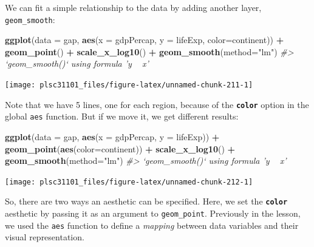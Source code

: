 \documentclass[
]{book}
\newenvironment{Shaded}{\begin{snugshade}}{\end{snugshade}}
\newcommand{\CommentTok}[1]{\textcolor[rgb]{0.56,0.35,0.01}{\textit{#1}}}
\newcommand{\DataTypeTok}[1]{\textcolor[rgb]{0.13,0.29,0.53}{#1}}
\newcommand{\KeywordTok}[1]{\textcolor[rgb]{0.13,0.29,0.53}{\textbf{#1}}}
\newcommand{\NormalTok}[1]{#1}
\newcommand{\OperatorTok}[1]{\textcolor[rgb]{0.81,0.36,0.00}{\textbf{#1}}}
\newcommand{\StringTok}[1]{\textcolor[rgb]{0.31,0.60,0.02}{#1}}
\begin{document}
We can fit a simple relationship to the data by adding another layer, \texttt{geom\_smooth}:

\begin{Shaded}
\begin{Highlighting}[]
\KeywordTok{ggplot}\NormalTok{(}\DataTypeTok{data =}\NormalTok{ gap, }\KeywordTok{aes}\NormalTok{(}\DataTypeTok{x =}\NormalTok{ gdpPercap, }\DataTypeTok{y =}\NormalTok{ lifeExp, }\DataTypeTok{color=}\NormalTok{continent)) }\OperatorTok{+}\StringTok{ }
\StringTok{  }\KeywordTok{geom_point}\NormalTok{() }\OperatorTok{+}\StringTok{ }
\StringTok{  }\KeywordTok{scale_x_log10}\NormalTok{() }\OperatorTok{+}\StringTok{ }
\StringTok{  }\KeywordTok{geom_smooth}\NormalTok{(}\DataTypeTok{method=}\StringTok{"lm"}\NormalTok{)}
\CommentTok{#> `geom_smooth()` using formula 'y ~ x'}
\end{Highlighting}
\end{Shaded}

\begin{center}\texttt{[image: plsc31101\_files/figure-latex/unnamed-chunk-211-1]} \end{center}

Note that we have 5 lines, one for each region, because of the \textbf{\texttt{color}} option in the global \texttt{aes} function. But if we move it, we get different results:

\begin{Shaded}
\begin{Highlighting}[]
\KeywordTok{ggplot}\NormalTok{(}\DataTypeTok{data =}\NormalTok{ gap, }\KeywordTok{aes}\NormalTok{(}\DataTypeTok{x =}\NormalTok{ gdpPercap, }\DataTypeTok{y =}\NormalTok{ lifeExp)) }\OperatorTok{+}\StringTok{ }
\StringTok{  }\KeywordTok{geom_point}\NormalTok{(}\KeywordTok{aes}\NormalTok{(}\DataTypeTok{color=}\NormalTok{continent)) }\OperatorTok{+}\StringTok{ }
\StringTok{  }\KeywordTok{scale_x_log10}\NormalTok{() }\OperatorTok{+}\StringTok{ }
\StringTok{  }\KeywordTok{geom_smooth}\NormalTok{(}\DataTypeTok{method=}\StringTok{"lm"}\NormalTok{)}
\CommentTok{#> `geom_smooth()` using formula 'y ~ x'}
\end{Highlighting}
\end{Shaded}

\begin{center}\texttt{[image: plsc31101\_files/figure-latex/unnamed-chunk-212-1]} \end{center}

So, there are two ways an aesthetic can be specified. Here, we set the \textbf{\texttt{color}} aesthetic by passing it as an argument to \texttt{geom\_point}. Previously in the lesson, we used the \texttt{aes} function to define a \emph{mapping} between data variables and their visual representation.
\end{document}
